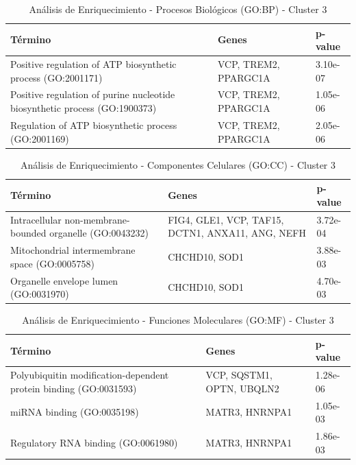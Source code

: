 \begin{table}[H]
	\centering
	\caption{Análisis de Enriquecimiento - Procesos Biológicos (GO:BP) - Cluster 3}
	\label{tb:c2_t1}
	\begin{tabular}{|p{4cm}|p{4cm}|p{3cm}|}
		\hline
		\textbf{Término} & \textbf{Genes} & \textbf{p-value} \\ \hline
		Positive regulation of ATP biosynthetic process (GO:2001171) & VCP, TREM2, PPARGC1A & 3.10e-07 \\ \hline
		Positive regulation of purine nucleotide biosynthetic process (GO:1900373) & VCP, TREM2, PPARGC1A & 1.05e-06 \\ \hline
		Regulation of ATP biosynthetic process (GO:2001169) & VCP, TREM2, PPARGC1A & 2.05e-06 \\ \hline
	\end{tabular}
\end{table}

\begin{table}[H]
	\centering
	\caption{Análisis de Enriquecimiento - Componentes Celulares (GO:CC) - Cluster 3}
	\label{tb:c2_t2}
	\begin{tabular}{|p{4cm}|p{4cm}|p{3cm}|}
		\hline
		\textbf{Término} & \textbf{Genes} & \textbf{p-value} \\ \hline
		Intracellular non-membrane-bounded organelle (GO:0043232) & FIG4, GLE1, VCP, TAF15, DCTN1, ANXA11, ANG, NEFH & 3.72e-04 \\ \hline
		Mitochondrial intermembrane space (GO:0005758) & CHCHD10, SOD1 & 3.88e-03 \\ \hline
		Organelle envelope lumen (GO:0031970) & CHCHD10, SOD1 & 4.70e-03 \\ \hline
	\end{tabular}
\end{table}


\begin{table}[H]
	\centering
	\caption{Análisis de Enriquecimiento - Funciones Moleculares (GO:MF) - Cluster 3}
	\label{tb:c2_t3}
	\begin{tabular}{|p{4cm}|p{4cm}|p{3cm}|}
		\hline
		\textbf{Término} & \textbf{Genes} & \textbf{p-value} \\ \hline
		Polyubiquitin modification-dependent protein binding (GO:0031593) & VCP, SQSTM1, OPTN, UBQLN2 & 1.28e-06 \\ \hline
		miRNA binding (GO:0035198) & MATR3, HNRNPA1 & 1.05e-03 \\ \hline
		Regulatory RNA binding (GO:0061980) & MATR3, HNRNPA1 & 1.86e-03 \\ \hline
	\end{tabular}
\end{table}

